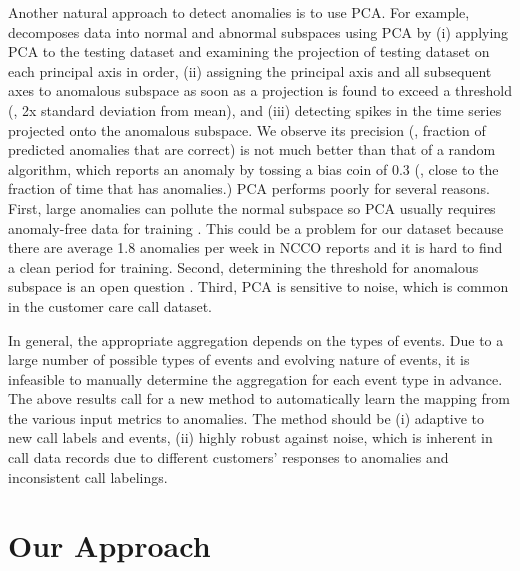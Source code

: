 Another natural approach to detect anomalies is to use PCA. For example,
\cite{PCA2} decomposes data into normal and abnormal
subspaces using PCA by (i) applying 
PCA to the testing dataset and examining the projection of testing
dataset on each principal axis in order, (ii) assigning the principal 
axis and all subsequent axes to anomalous
subspace as soon as a projection is
found to exceed a threshold (\eg, 2x standard deviation from mean),
and (iii) detecting spikes in the time series projected onto the
anomalous subspace. We observe its precision (\ie, fraction of predicted 
anomalies that are correct) is not much better than that of a random 
algorithm, which reports an anomaly by tossing a bias
coin of 0.3 (\ie, close to the fraction of time that has
anomalies.) 
PCA performs poorly for several reasons. First, large anomalies can 
pollute the normal subspace \cite{PCA-sensitivity} so PCA usually requires 
anomaly-free data for training \cite{PCA-unsupervised}. This could be a problem 
for our dataset because there are average 1.8 anomalies per week in NCCO reports 
and it is hard to find a clean period for training. Second, determining the threshold 
for anomalous subspace is an open question \cite{PCA-sensitivity, PCA-structural, PCA2}. 
Third, PCA is sensitive to noise, which is common in the customer care call dataset. 

In general, the appropriate aggregation depends on the types of
events. Due to a large number of possible types of events and
evolving nature of events, it is infeasible to manually determine the
aggregation for each event type in advance. 
The above results call for a new method to automatically learn the
mapping from the various input metrics to anomalies. The method should
be (i) adaptive to new call labels and events, (ii) highly robust
against noise, which is inherent in call data records due to different
customers' responses to anomalies and inconsistent 
call labelings.




\section{Our Approach}
\label{sec:approach}

